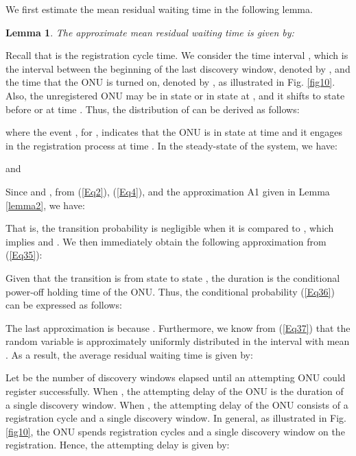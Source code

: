 \documentclass[journal]{IEEEtran}
\newtheorem{lemma}{\textbf{Lemma}}
\begin{document}
We first estimate the mean residual waiting time in the following lemma.
\begin{lemma}\label{lemma3}
  The approximate mean residual waiting time is given by:

\end{lemma}
\begin{IEEEproof}
   Recall that  is the registration cycle time. We consider the time interval , which is the interval between the beginning of the last discovery window, denoted by , and the time that the ONU is turned on, denoted by , as illustrated in Fig. \ref{fig10}. Also, the unregistered ONU may be in state  or in state  at , and it shifts to state  before or at time . Thus, the distribution of  can be derived as follows:

where the event , for , indicates that the ONU is in state  at time  and it engages in the registration process at time . In the steady-state of the system, we have:

and

Since  and , from (\ref{Eq2}), (\ref{Eq4}), and the approximation A1 given in Lemma \ref{lemma2}, we have:

That is, the transition probability  is negligible when it is compared to , which implies  and . We then immediately obtain the following approximation from (\ref{Eq35}):

Given that the transition is from state  to state , the duration  is the conditional power-off holding time of the ONU. Thus, the conditional probability (\ref{Eq36}) can be expressed as follows:

The last approximation is because . Furthermore, we know from (\ref{Eq37}) that the random variable  is approximately uniformly distributed in the interval  with mean . As a result, the average residual waiting time is given by:

\end{IEEEproof}

Let  be the number of discovery windows elapsed until an attempting ONU could register successfully. When , the attempting delay of the ONU is the duration of a single discovery window. When , the attempting delay of the ONU consists of a registration cycle and a single discovery window. In general, as illustrated in Fig. \ref{fig10}, the ONU spends  registration cycles and a single discovery window on the registration. Hence, the attempting delay is given by:
\end{document}
